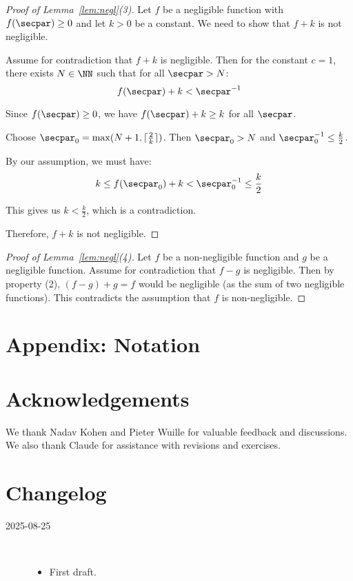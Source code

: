 \documentclass[
  a4paper,
  orivec,oribibl]{llncs}
\begin{document}
\begin{proof}[Proof of Lemma~\ref{lem:negl}(3)]
  Let $f$ be a negligible function with $f(\secpar) \ge 0$ and let $k > 0$ be a constant.
  We need to show that $f + k$ is not negligible.
  
  Assume for contradiction that $f + k$ is negligible. 
  Then for the constant $c = 1$, there exists $N \in \NN$ such that for all $\secpar > N$:
  \[
    f(\secpar) + k < \secpar^{-1}
  \]
  
  Since $f(\secpar) \ge 0$, we have $f(\secpar) + k \ge k$ for all $\secpar$.
  
  Choose $\secpar_0 = \max(N + 1, \lceil \frac{2}{k} \rceil)$. Then $\secpar_0 > N$ and $\secpar_0^{-1} \le \frac{k}{2}$.
  
  By our assumption, we must have:
  \[
    k \le f(\secpar_0) + k < \secpar_0^{-1} \le \frac{k}{2}
  \]
  
  This gives us $k < \frac{k}{2}$, which is a contradiction.
  
  Therefore, $f + k$ is not negligible.
\end{proof}

\begin{proof}[Proof of Lemma~\ref{lem:negl}(4)]
  Let $f$ be a non-negligible function and $g$ be a negligible function.
  Assume for contradiction that $f - g$ is negligible.
  Then by property (2), $(f - g) + g = f$ would be negligible (as the sum of two negligible functions).
  This contradicts the assumption that $f$ is non-negligible.
\end{proof}

\section{Appendix: Notation}\label{sec:appendix-notation}

\section*{Acknowledgements}
We thank Nadav Kohen and Pieter Wuille for valuable feedback and discussions.
We also thank Claude for assistance with revisions and exercises.

\iffull

  \section*{Changelog}\label{sec:changelog}
  \begin{description}
    \item[2025-08-25]\
          \begin{itemize}
            \item First draft.
          \end{itemize}
  \end{description}
  \vspace{-2em}
\fi

{}
\printbibliography\label{sec:bib}
\end{document}
